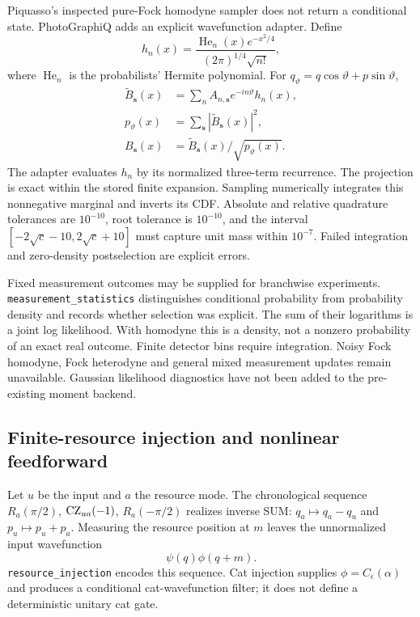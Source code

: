 Piquasso's inspected pure-Fock homodyne sampler does not return a conditional
state. PhotoGraphiQ adds an explicit wavefunction adapter. Define
\begin{equation}
 h_n(x)=\frac{\operatorname{He}_n(x)e^{-x^2/4}}
 {(2\pi)^{1/4}\sqrt{n!}},
\end{equation}
where $\operatorname{He}_n$ is the probabilists' Hermite polynomial. For
$q_\vartheta=q\cos\vartheta+p\sin\vartheta$,
\begin{align}
 \widetilde B_{\bm s}(x)&=\sum_n A_{n,\bm s}e^{-in\vartheta}h_n(x),\\
 p_\vartheta(x)&=\sum_{\bm s}|\widetilde B_{\bm s}(x)|^2,\\
 B_{\bm s}(x)&=\widetilde B_{\bm s}(x)/\sqrt{p_\vartheta(x)}.
\end{align}
The adapter evaluates $h_n$ by its normalized three-term recurrence. The
projection is exact within the stored finite expansion. Sampling numerically
integrates this nonnegative marginal and inverts its CDF. Absolute and relative
quadrature tolerances are $10^{-10}$, root tolerance is $10^{-10}$, and the
interval $[-2\sqrt c-10,2\sqrt c+10]$ must capture unit mass within $10^{-7}$.
Failed integration and zero-density postselection are explicit errors.

Fixed measurement outcomes may be supplied for branchwise experiments.
\texttt{measurement\_statistics} distinguishes conditional probability from
probability density and records whether selection was explicit. The sum of
their logarithms is a joint log likelihood. With homodyne this is a density,
not a nonzero probability of an exact real outcome. Finite detector bins require
integration. Noisy Fock homodyne, Fock heterodyne and general mixed measurement
updates remain unavailable. Gaussian likelihood diagnostics have not been added
to the pre-existing moment backend.

\subsection{Finite-resource injection and nonlinear feedforward}

Let $u$ be the input and $a$ the resource mode. The chronological sequence
$R_a(\pi/2)$, $\operatorname{CZ}_{ua}(-1)$, $R_a(-\pi/2)$ realizes inverse SUM:
$q_a\mapsto q_a-q_u$ and $p_u\mapsto p_u+p_a$.
Measuring the resource position at $m$ leaves the unnormalized input wavefunction
\begin{equation}
 \psi(q)\phi(q+m).\label{eq:resourceFilter}
\end{equation}
\texttt{resource\_injection} encodes this sequence. Cat injection supplies
$\phi=C_\epsilon(\alpha)$ and produces a conditional cat-wavefunction filter;
it does not define a deterministic unitary cat gate.

